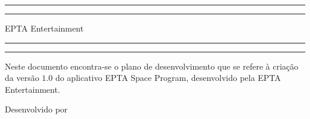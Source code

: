 \begin{titlepage} %

	\AddToShipoutPicture*{\BackgroundPic}
	\begin{minipage}[h!]{0.36\textwidth}
        \phantom{..}
    \end{minipage} 
    \begin{minipage}[h!]{0.6\textwidth}
	
		\centering %
	
		\scshape %
	
	
		\rule{\textwidth}{1.6pt}\vspace*{-\baselineskip}\vspace*{2pt} %
		\rule{\textwidth}{0.4pt} %
	
		\vspace{0.75\baselineskip} %
	
		{\LARGE EPTA Entertainment\\} %
	
		\vspace{0.75\baselineskip} %
	
		\rule{\textwidth}{0.4pt}\vspace*{-\baselineskip}\vspace{3.2pt} %
		\rule{\textwidth}{1.6pt} %
	
		\vspace{2\baselineskip} %
	
	
		Neste documento encontra-se o plano de desenvolvimento que se refere à criação da versão $1.0$ do aplicativo EPTA Space Program, desenvolvido pela EPTA Entertainment.%
	
		\vspace*{3\baselineskip} %
	
	
		Desenvolvido por
	

\end{minipage}
\end{titlepage}
